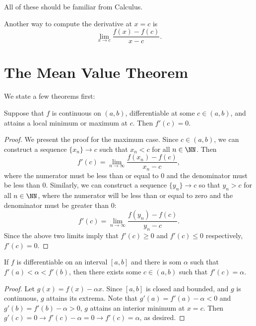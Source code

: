 All of these should be familiar from Calculus. 

\begin{remark*}
Another way to compute the derivative at $x = c$ is 
\[ \lim_{x\to c} \dfrac{f(x) - f(c)}{x - c}. \] 
\end{remark*}

\section{The Mean Value Theorem}
We state a few theorems first:

\begin{theorem}
Suppose that $f$ is continuous on $(a,b)$, differentiable at some $c \in (a,b)$, and attains a local minimum or maximum at $c$. Then $f'(c) = 0$. 
\end{theorem}
\begin{proof}
We present the proof for the maximum case. Since $c \in (a,b)$, we can construct a sequence $\{x_n\} \to c$ such that $x_n < c$ for all $n \in \NN$. Then 
\[ f'(c) = \lim_{n\to \infty} \dfrac{f(x_n) - f(c)}{x_n - c}, \] where the numerator must be less than or equal to 0 and the denominator must be less than 0. Similarly, we can construct a sequence $\{y_n\} \to c$ so that $y_n > c$ for all $n \in \NN$, where the numerator will be less than or equal to zero and the denominator must be greater than 0:
\[ f'(c) = \lim_{n\to\infty} \dfrac{f(y_n) - f(c)}{y_n - c}. \] Since the above two limits imply that $f'(c) \geq 0$ and $f'(c) \leq 0$ respectively, $f'(c) = 0$. 
\end{proof}

\begin{theorem}
If $f$ is differentiable on an interval $[a,b]$ and there is som $\alpha$ such that $f'(a) < \alpha < f'(b)$, then there exists some $c \in (a,b)$ such that $f'(c) = \alpha$. 
\end{theorem}
\begin{proof}
Let $g(x) = f(x) - \alpha x$. Since $[a,b]$ is closed and bounded, and $g$ is continuous, $g$ attains its extrema. Note that $g'(a) = f'(a) - \alpha < 0$ and $g'(b) = f'(b) - \alpha > 0$, $g$ attains an interior minimum at $x = c$. Then $g'(c) = 0 \longrightarrow f'(c) - \alpha = 0 \longrightarrow f'(c) = \alpha$, as desired. 
\end{proof}

